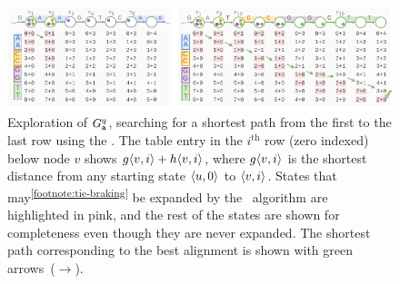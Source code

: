 \begin{figure}[t]
    \centering
	\includegraphics[width=\linewidth]{figures/seed-heuristic-tables}
	\caption{Exploration of $\AG[q]$, searching for a shortest path from the
	first to the last row using the \seedh. The table entry in the $i^\text{th}$
	row (zero indexed) below node $v$ shows $g\st{v}{i}+h\st{v}{i}$, where
	$g\st{v}{i}$ is the shortest distance from any starting state $\st{u}{0}$ to
	$\st{v}{i}$.
	States that may\textsuperscript{\ref{footnote:tie-braking}} be expanded by
	the \A~algorithm are highlighted in \colorbox{pink-highlight}{pink}, and the
	rest of the states are shown for completeness even though they are never
	expanded. The shortest path corresponding to the best alignment is shown
	with green arrows~(\textcolor{dark-green}{$\pmb{\rightarrow}$}).}
	\label{fig:exploration-table}
\end{figure}
